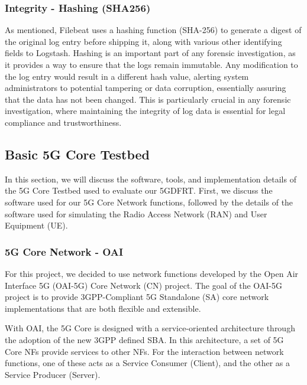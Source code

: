 \documentclass[final,1p,times,authoryear]{elsarticle}
\begin{document}
\subsubsection{Integrity - Hashing (SHA256)}
\label{sub3sub5sec3}
As mentioned, Filebeat uses a hashing function (SHA-256) to generate a digest of the original log entry before shipping it, along with various other identifying fields to Logstash. Hashing is an important part of any forensic investigation, as it provides a way to ensure that the logs remain immutable. Any modification to the log entry would result in a different hash value, alerting system administrators to potential tampering or data corruption, essentially assuring that the data has not been changed. This is particularly crucial in any forensic investigation, where maintaining the integrity of log data is essential for legal compliance and trustworthiness.

\subsection{Basic 5G Core Testbed}
\label{sub3sec6}
In this section, we will discuss the software, tools, and implementation details of the 5G Core Testbed used to evaluate our  5GDFRT. First, we discuss the software used for our 5G Core Network functions, followed by the details of the software used for simulating the Radio Access Network (RAN) and User Equipment (UE).

\subsubsection{5G Core Network - OAI}
\label{sub3sub6sec1}
For this project, we decided to use network functions developed by the Open Air Interface 5G (OAI-5G) Core Network (CN) project. The goal of the OAI-5G project is to provide 3GPP-Compliant 5G Standalone (SA) core network implementations that are both flexible and extensible.

\vspace{1em}

With OAI, the 5G Core is designed with a service-oriented architecture through the adoption of the new 3GPP defined SBA. In this architecture, a set of 5G Core NFs provide services to other NFs. For the interaction between network functions, one of these acts as a Service Consumer (Client), and the other as a Service Producer (Server).

\vspace{1em}
\end{document}
